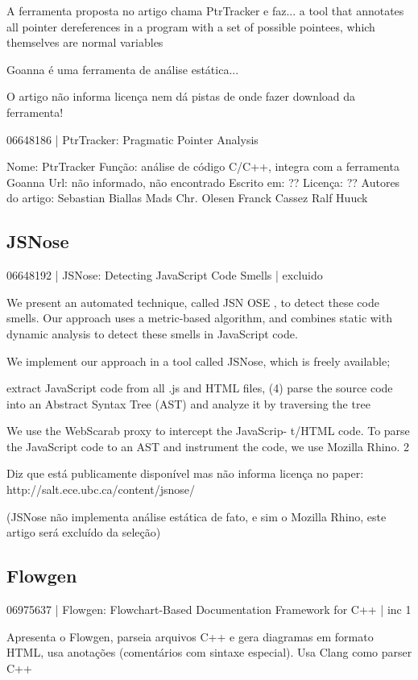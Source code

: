 A ferramenta proposta no artigo chama PtrTracker e faz... a
tool that annotates all pointer dereferences in a program with a set of
possible pointees, which themselves are normal variables

Goanna é uma ferramenta de análise estática...

O artigo não informa licença nem dá pistas de onde fazer download da
ferramenta!

06648186 | PtrTracker: Pragmatic Pointer Analysis

Nome: PtrTracker
Função: análise de código C/C++, integra com a ferramenta Goanna
Url: não informado, não encontrado
Escrito em: ??
Licença: ??
Autores do artigo: Sebastian Biallas
                   Mads Chr. Olesen
                   Franck Cassez
                   Ralf Huuck

\subsection{JSNose}

06648192 | JSNose: Detecting JavaScript Code Smells | excluido

We present an automated
technique, called JSN OSE , to detect these code smells. Our
approach uses a metric-based algorithm, and combines static
with dynamic analysis to detect these smells in JavaScript
code.

We implement our approach in a tool called JSNose,
which is freely available;

extract JavaScript code from all .js and HTML
files, (4) parse the source code into an Abstract Syntax Tree
(AST) and analyze it by traversing the tree

We use the WebScarab proxy to intercept the JavaScrip-
t/HTML code. To parse the JavaScript code to an AST and
instrument the code, we use Mozilla Rhino. 2

Diz que está publicamente disponível mas não informa licença no paper:
http://salt.ece.ubc.ca/content/jsnose/

(JSNose não implementa análise estática de fato, e sim o Mozilla Rhino, este
artigo será excluído da seleção)

\subsection{Flowgen}

06975637 | Flowgen: Flowchart-Based Documentation Framework for C++ | inc 1

Apresenta o Flowgen, parseia arquivos C++ e gera diagramas em formato HTML, usa
anotações (comentários com sintaxe especial). Usa Clang como parser C++

